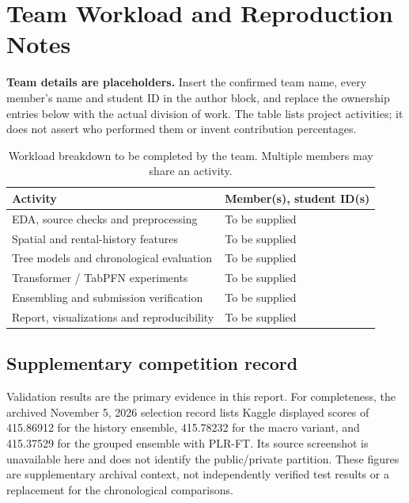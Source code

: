 \documentclass[conference]{IEEEtran}
\begin{document}
\clearpage
\appendices
\section{Team Workload and Reproduction Notes}
\begingroup\raggedright
\noindent\textbf{Team details are placeholders.} Insert the confirmed team name, every member's name and student ID in the author block, and replace the ownership entries below with the actual division of work. The table lists project activities; it does not assert who performed them or invent contribution percentages.

\begin{table}[h]
\caption{Workload breakdown to be completed by the team. Multiple members may share an activity.}
\centering\small
\begin{tabular}{p{}p{}}
\toprule
Activity & Member(s), student ID(s)\\
\midrule
EDA, source checks and preprocessing & To be supplied\\
Spatial and rental-history features & To be supplied\\
Tree models and chronological evaluation & To be supplied\\
Transformer / TabPFN experiments & To be supplied\\
Ensembling and submission verification & To be supplied\\
Report, visualizations and reproducibility & To be supplied\\
\bottomrule
\end{tabular}
\end{table}

\subsection{Supplementary competition record}
Validation results are the primary evidence in this report. For completeness, the archived November 5, 2026 selection record lists Kaggle displayed scores of 415.86912 for the history ensemble, 415.78232 for the macro variant, and 415.37529 for the grouped ensemble with PLR-FT. Its source screenshot is unavailable here and does not identify the public/private partition. These figures are supplementary archival context, not independently verified test results or a replacement for the chronological comparisons.

\begin{table}[h]
\caption{Archived pipeline comparison moved from the main table. Annual/recent development RMSE (SGD); the supplied-macro row uses a different information scenario.}
\label{tab:archivedpipelines}
\centering\small

\end{table}
\end{document}
